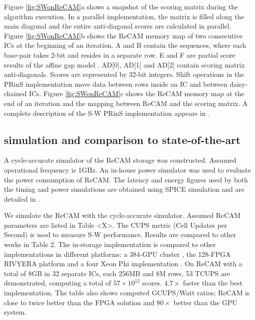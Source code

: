 \documentclass{superfri}
\begin{document}
Figure \ref{fig:SWonReCAM}a shows a snapshot of the scoring matrix during the algorithm execution. In a parallel implementation, the matrix is filled along the main diagonal and the entire anti-diagonal scores are calculated in parallel. Figure \ref{fig:SWonReCAM}b shows the ReCAM memory map of two consecutive ICs at the beginning of an iteration. A and B contain the sequences, where each base-pair takes 2-bit and resides in a separate row. E and F are partial score results of the affine gap model \cite{giridhar2013exploring}. AD[0], AD[1] and AD[2] contain scoring matrix anti-diagonals. Scores are represented by 32-bit integers. Shift operations in the PRinS implementation move data between rows inside an IC and between daisy-chained ICs. Figure \ref{fig:SWonReCAM}c shows the ReCAM memory map at the end of an iteration and the mapping between ReCAM and the scoring matrix. A complete description of the S-W PRinS implementation appears in \cite{kaplan2017resistive}.

\subsection{simulation and comparison to state-of-the-art}
\label{sec:SW_simulation}


A cycle-accurate simulator of the ReCAM storage was constructed. Assumed operational frequency is 1GHz. An in-house power simulator was used to evaluate the power consumption of ReCAM. The latency and energy figures used by both the timing and power simulations are obtained using SPICE simulation and are detailed in \cite{yavits2015resistive}. 

We simulate the ReCAM with the cycle-accurate simulator. Assumed ReCAM parameters are listed in Table <X>. The CUPS metric (Cell Updates per Second) is used to measure S-W performance. Results are compared to other works in Table 2. The in-storage implementation is compared to other implementations in different platforms: a 384-GPU cluster \cite{de2016cudalign}, the 128-FPGA RIVYERA platform \cite{wienbrandt2014fpga} and a four Xeon Phi implementation \cite{liu2014swaphi}. On ReCAM with a total of 8GB in 32 separate ICs, each 256MB and 8M rows, 53 TCUPS are demonstrated, computing a total of $57\times10^{12}$ scores. $4.7\times$ faster than the best implementation. The table also shows computed GCUPS/Watt ratios; ReCAM is close to twice better than the FPGA solution and $80\times$ better than the GPU system.
\end{document}
